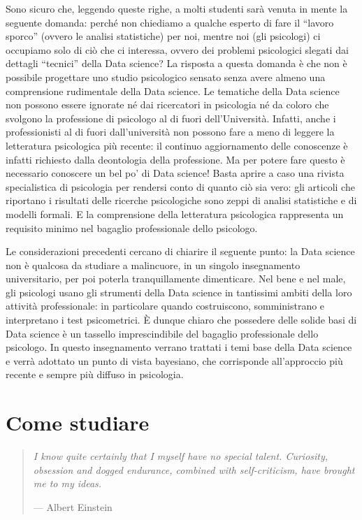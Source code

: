\documentclass[
  10pt,
  italian,
  a4paper,
  extrafontsizes,onecolumn,openright
  ]{memoir}
\begin{document}
Sono sicuro che, leggendo queste righe, a molti studenti sarà venuta in mente la seguente domanda: perché non chiediamo a qualche esperto di fare il ``lavoro sporco'' (ovvero le analisi statistiche) per noi, mentre noi (gli psicologi) ci occupiamo solo di ciò che ci interessa, ovvero dei problemi psicologici slegati dai dettagli ``tecnici'' della Data science? La risposta a questa domanda è che non è possibile progettare uno studio psicologico sensato senza avere almeno una comprensione rudimentale della Data science. Le tematiche della Data science non possono essere ignorate né dai ricercatori in psicologia né da coloro che svolgono la professione di psicologo al di fuori dell'Università. Infatti, anche i professionisti al di fuori dall'università non possono fare a meno di leggere la letteratura psicologica più recente: il continuo aggiornamento delle conoscenze è infatti richiesto dalla deontologia della professione. Ma per potere fare questo è necessario conoscere un bel po' di Data science! Basta aprire a caso una rivista specialistica di psicologia per rendersi conto di quanto ciò sia vero: gli articoli che riportano i risultati delle ricerche psicologiche sono zeppi di analisi statistiche e di modelli formali. E la comprensione della letteratura psicologica rappresenta un requisito minimo nel bagaglio professionale dello psicologo.

Le considerazioni precedenti cercano di chiarire il seguente punto: la Data science non è qualcosa da studiare a malincuore, in un singolo insegnamento universitario, per poi poterla tranquillamente dimenticare. Nel bene e nel male, gli psicologi usano gli strumenti della Data science in tantissimi ambiti della loro attività professionale: in particolare quando costruiscono, somministrano e interpretano i test psicometrici. È dunque chiaro che possedere delle solide basi di Data science è un tassello imprescindibile del bagaglio professionale dello psicologo. In questo insegnamento verrano trattati i temi base della Data science e verrà adottato un punto di vista bayesiano, che corrisponde all'approccio più recente e sempre più diffuso in psicologia.

\hypertarget{come-studiare}{%
\section{Come studiare}\label{come-studiare}}

\begin{quote}
\emph{I know quite certainly that I myself have no special talent. Curiosity, obsession and dogged endurance, combined with self-criticism, have brought me to my ideas.}

\hfill --- Albert Einstein
\end{quote}
\end{document}
